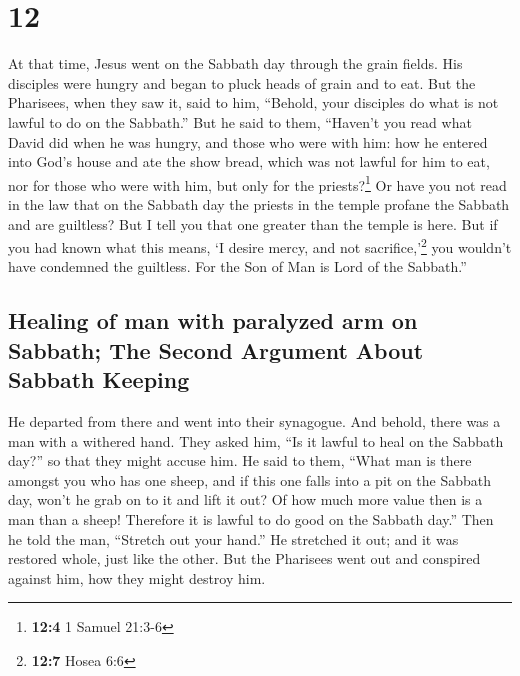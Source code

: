 \hypertarget{section-11}{%
\section{12}\label{section-11}}

 At that time, Jesus went on the Sabbath day through the
grain fields. His disciples were hungry and began to pluck heads of
grain and to eat.  But the Pharisees, when they saw it,
said to him, ``Behold, your disciples do what is not lawful to do on the
Sabbath.''  But he said to them, ``Haven't you read what
David did when he was hungry, and those who were with him:
 how he entered into God's house and ate the show bread,
which was not lawful for him to eat, nor for those who were with him,
but only for the priests?\footnote{\textbf{12:4} 1 Samuel 21:3-6}
 Or have you not read in the law that on the Sabbath day
the priests in the temple profane the Sabbath and are guiltless?
 But I tell you that one greater than the temple is here.
 But if you had known what this means, `I desire mercy,
and not sacrifice,'\footnote{\textbf{12:7} Hosea 6:6} you wouldn't have
condemned the guiltless.  For the Son of Man is Lord of
the Sabbath.''

\hypertarget{healing-of-man-with-paralyzed-arm-on-sabbath-the-second-argument-about-sabbath-keeping}{%
\subsection{Healing of man with paralyzed arm on Sabbath; The Second
Argument About Sabbath
Keeping}\label{healing-of-man-with-paralyzed-arm-on-sabbath-the-second-argument-about-sabbath-keeping}}

 He departed from there and went into their synagogue.
 And behold, there was a man with a withered hand. They
asked him, ``Is it lawful to heal on the Sabbath day?'' so that they
might accuse him.  He said to them, ``What man is there
amongst you who has one sheep, and if this one falls into a pit on the
Sabbath day, won't he grab on to it and lift it out?  Of
how much more value then is a man than a sheep! Therefore it is lawful
to do good on the Sabbath day.''  Then he told the man,
``Stretch out your hand.'' He stretched it out; and it was restored
whole, just like the other.  But the Pharisees went out
and conspired against him, how they might destroy him.

